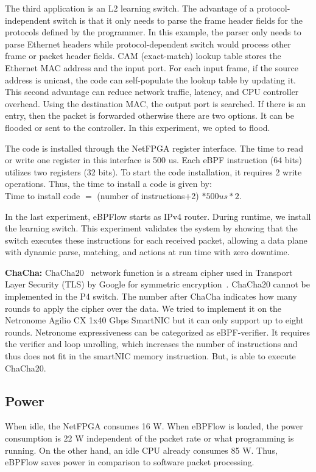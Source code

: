 The third application is an L2 learning switch.
The advantage of a protocol-independent switch is that it only needs to parse the frame header fields for the protocols defined by the programmer. In this example, the parser only needs to parse Ethernet headers while protocol-dependent switch would process other frame or packet header fields. CAM (exact-match) lookup table stores the Ethernet MAC address and the input port. 
For each input frame, if the source address is unicast, the code can self-populate the lookup table by updating it.
This second advantage can reduce network traffic, latency, and CPU controller overhead.
Using the destination MAC, the output port is searched.
If there is an entry, then the packet is forwarded otherwise there are two options. It can be flooded or sent to the controller. In this experiment, we opted to flood.


The code is installed through the NetFPGA register interface.
The time to read or write one register in this interface is 500 us.
Each eBPF instruction (64 bits) utilizes two registers (32 bits).
To start the code installation, it requires 2 write operations.
Thus, the time to install a code is given by:\\
Time to install code $=$ (number of instructions+2) $* 500 us * 2.$ 

In the last experiment, eBPFlow starts as IPv4 router. During runtime, we install the learning switch. This experiment validates the system by showing that the switch executes these instructions for each received packet, allowing a data plane with dynamic parse, matching, and actions at run time with zero downtime.

\textbf{ChaCha:} 
ChaCha20~\cite{rfc8439} network function is a
stream cipher used in Transport Layer Security (TLS) by Google for symmetric
encryption~\cite{google-chacha}.
ChaCha20 cannot be implemented in the P4 switch.
The number after ChaCha indicates how many rounds to apply the cipher over the data.
We tried to implement it on the Netronome Agilio CX 1x40 Gbps SmartNIC but it can only support up to eight rounds. Netronome expressiveness can be categorized as eBPF-verifier. It requires the verifier and loop unrolling, which increases the number of instructions and thus does not fit in the smartNIC memory instruction.
But, \system is able to execute ChaCha20.




\subsection{Power}

When idle, the NetFPGA consumes 16 W.
When eBPFlow is loaded, the power consumption is 22 W independent of the packet rate or what programming is running.
On the other hand, an idle CPU already consumes 85 W.
Thus, eBPFlow saves power in comparison to software packet processing.


